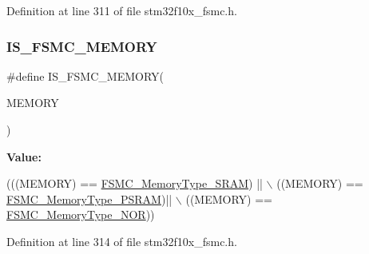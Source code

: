 Definition at line 311 of file stm32f10x\+\_\+fsmc.\+h.

\mbox{\label{group___f_s_m_c___memory___type_ga255cd500e141f4ac024cf5f896921233}} 
\subsubsection{\texorpdfstring{I\+S\+\_\+\+F\+S\+M\+C\+\_\+\+M\+E\+M\+O\+RY}{IS\_FSMC\_MEMORY}}
{\footnotesize\ttfamily \#define I\+S\+\_\+\+F\+S\+M\+C\+\_\+\+M\+E\+M\+O\+RY(\begin{DoxyParamCaption}\item[{}]{M\+E\+M\+O\+RY }\end{DoxyParamCaption})}

{\bfseries Value\+:}
\begin{DoxyCode}
(((MEMORY) == \hyperlink{group___f_s_m_c___memory___type_ga8a24e8da42e67dcf6fb2f43659aa49cf}{FSMC\_MemoryType\_SRAM}) || \(\backslash\)
                                ((MEMORY) == \hyperlink{group___f_s_m_c___memory___type_gae3e680998b2fee8d56222634f5268a75}{FSMC\_MemoryType\_PSRAM})|| \(\backslash\)
                                ((MEMORY) == \hyperlink{group___f_s_m_c___memory___type_ga8b9390abe7c281947c550bf4365649e5}{FSMC\_MemoryType\_NOR}))
\end{DoxyCode}


Definition at line 314 of file stm32f10x\+\_\+fsmc.\+h.

